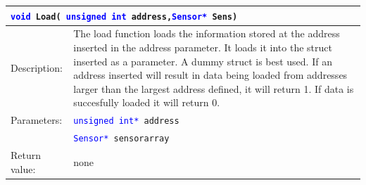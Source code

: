 \begin{table}[H]
\begin{tabular}{l p{12.5cm}}
\multicolumn{2}{p{15cm}}{\texttt{\textcolor{blue}{void} Load( \textcolor{blue}{unsigned int} address,\texttt{\textcolor{blue}{Sensor*} Sens})}} \\
\hline
Description:& The load function loads the information stored at the address inserted in the address parameter. It loads it into the struct inserted as a parameter. A dummy struct is best used. If an address inserted will result in data being loaded from addresses larger than the largest address defined, it will return 1. If data is succesfully loaded it will return 0.\\
Parameters:&\texttt{\textcolor{blue}{unsigned int*} address}\\
&\texttt{\textcolor{blue}{Sensor*} sensorarray}\\
Return value:&none\\
\end{tabular}
\end{table}


